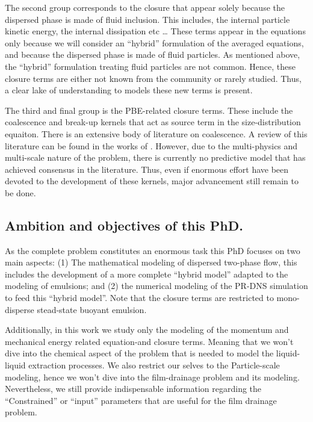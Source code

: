 The second group corresponds to the closure that appear solely because the dispersed phase is made of fluid inclusion. 
This includes, the internal particle kinetic energy, the internal dissipation etc \ldots
These terms appear in the equations only because we will consider an ``hybrid'' formulation of the averaged equations, and because the dispersed phase is made of fluid particles. 
As mentioned above, the ``hybrid'' formulation treating fluid particles are not common. 
Hence, these closure terms are either not known from the community or rarely studied. 
Thus, a clear lake of understanding to models these new terms is present.  

The third and final group is the PBE-related closure terms. 
These include the coalescence and break-up kernels that act as source term in the size-distribution equaiton. 
There is an extensive body of literature on coalescence. 
A review of this literature can be found in the works of \citet{chesters1991modelling}. 
However, due to the multi-physics and multi-scale nature of the problem, there is currently no predictive model that has achieved consensus in the literature. 
Thus, even if enormous effort have been devoted to the development of these kernels, major advancement still remain to be done. 



\subsection{Ambition and objectives of this PhD.}




As the complete problem constitutes an enormous task this PhD focuses on two main aspects: 
(1) The mathematical modeling of dispersed two-phase flow, this includes the development of a more complete ``hybrid model'' adapted to the modeling of emulsions; and (2) the numerical modeling of the PR-DNS simulation to feed this ``hybrid model''. Note that the closure terms are restricted to mono-disperse stead-state buoyant emulsion. 

Additionally, in this work we study only the modeling of the momentum and mechanical energy related equation-and closure terms. 
Meaning that we won't dive into the chemical aspect of the problem that is needed to model the liquid-liquid extraction processes. 
We also restrict our selves to the Particle-scale modeling, hence we won't dive into the film-drainage problem and its modeling.   
Nevertheless, we still provide indispensable information regarding the ``Constrained'' or ``input'' parameters that are useful for the film drainage problem. 

